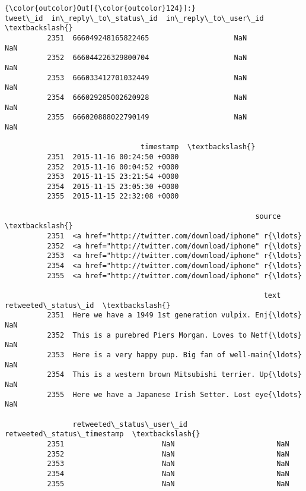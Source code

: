 \documentclass[11pt]{article}
\begin{document}
\begin{Verbatim}[commandchars=\\\{\}]
{\color{outcolor}Out[{\color{outcolor}124}]:}                 tweet\_id  in\_reply\_to\_status\_id  in\_reply\_to\_user\_id  \textbackslash{}
          2351  666049248165822465                    NaN                  NaN   
          2352  666044226329800704                    NaN                  NaN   
          2353  666033412701032449                    NaN                  NaN   
          2354  666029285002620928                    NaN                  NaN   
          2355  666020888022790149                    NaN                  NaN   
          
                                timestamp  \textbackslash{}
          2351  2015-11-16 00:24:50 +0000   
          2352  2015-11-16 00:04:52 +0000   
          2353  2015-11-15 23:21:54 +0000   
          2354  2015-11-15 23:05:30 +0000   
          2355  2015-11-15 22:32:08 +0000   
          
                                                           source  \textbackslash{}
          2351  <a href="http://twitter.com/download/iphone" r{\ldots}   
          2352  <a href="http://twitter.com/download/iphone" r{\ldots}   
          2353  <a href="http://twitter.com/download/iphone" r{\ldots}   
          2354  <a href="http://twitter.com/download/iphone" r{\ldots}   
          2355  <a href="http://twitter.com/download/iphone" r{\ldots}   
          
                                                             text  retweeted\_status\_id  \textbackslash{}
          2351  Here we have a 1949 1st generation vulpix. Enj{\ldots}                  NaN   
          2352  This is a purebred Piers Morgan. Loves to Netf{\ldots}                  NaN   
          2353  Here is a very happy pup. Big fan of well-main{\ldots}                  NaN   
          2354  This is a western brown Mitsubishi terrier. Up{\ldots}                  NaN   
          2355  Here we have a Japanese Irish Setter. Lost eye{\ldots}                  NaN   
          
                retweeted\_status\_user\_id retweeted\_status\_timestamp  \textbackslash{}
          2351                       NaN                        NaN   
          2352                       NaN                        NaN   
          2353                       NaN                        NaN   
          2354                       NaN                        NaN   
          2355                       NaN                        NaN   
          

\end{Verbatim}
\end{document}
